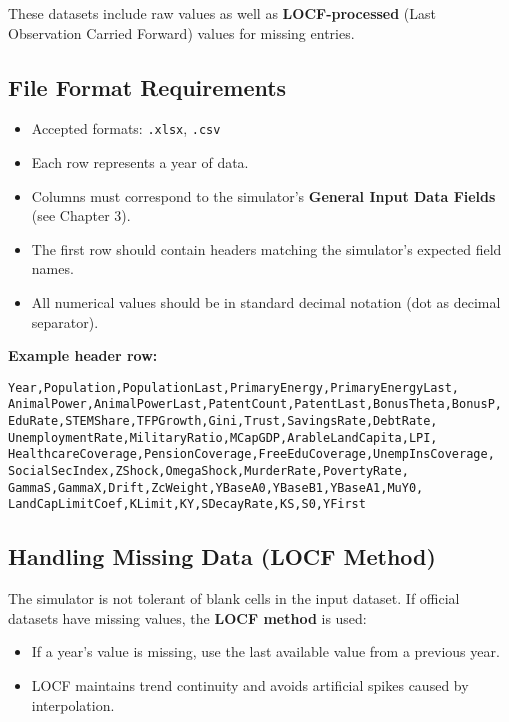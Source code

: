 \documentclass[12pt,a4paper]{article}
\begin{document}
\noindent
These datasets include raw values as well as \textbf{LOCF-processed} (Last Observation Carried Forward) values for missing entries.

\subsection{File Format Requirements}
\begin{itemize}
    \item Accepted formats: \texttt{.xlsx}, \texttt{.csv}
    \item Each row represents a year of data.
    \item Columns must correspond to the simulator’s \textbf{General Input Data Fields} (see Chapter 3).
    \item The first row should contain headers matching the simulator’s expected field names.
    \item All numerical values should be in standard decimal notation (dot as decimal separator).
\end{itemize}

\noindent
\textbf{Example header row:}
\begin{verbatim}
Year,Population,PopulationLast,PrimaryEnergy,PrimaryEnergyLast,
AnimalPower,AnimalPowerLast,PatentCount,PatentLast,BonusTheta,BonusP,
EduRate,STEMShare,TFPGrowth,Gini,Trust,SavingsRate,DebtRate,
UnemploymentRate,MilitaryRatio,MCapGDP,ArableLandCapita,LPI,
HealthcareCoverage,PensionCoverage,FreeEduCoverage,UnempInsCoverage,
SocialSecIndex,ZShock,OmegaShock,MurderRate,PovertyRate,
GammaS,GammaX,Drift,ZcWeight,YBaseA0,YBaseB1,YBaseA1,MuY0,
LandCapLimitCoef,KLimit,KY,SDecayRate,KS,S0,YFirst
\end{verbatim}

\subsection{Handling Missing Data (LOCF Method)}
The simulator is not tolerant of blank cells in the input dataset.  
If official datasets have missing values, the \textbf{LOCF method} is used:
\begin{itemize}
    \item If a year’s value is missing, use the last available value from a previous year.
    \item LOCF maintains trend continuity and avoids artificial spikes caused by interpolation.
\end{itemize}
\end{document}
